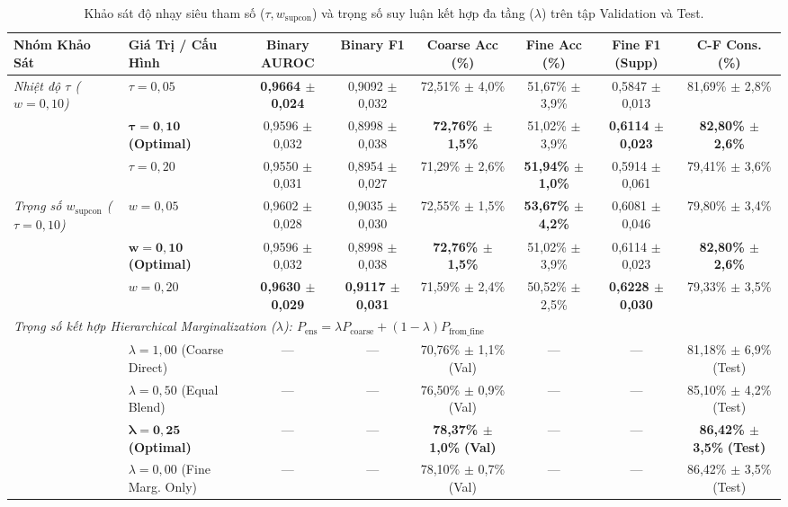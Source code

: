 \begin{table}[t]
\centering
\small
\caption{Khảo sát độ nhạy siêu tham số ($\tau, w_{\text{supcon}}$) và trọng số suy luận kết hợp đa tầng ($\lambda$) trên tập Validation và Test.}
\label{tab:ablation_hyperparameters_blending}
\begin{adjustbox}{width=\textwidth}
\begin{tabular}{llcccccc}
\toprule
\textbf{Nhóm Khảo Sát} & \textbf{Giá Trị / Cấu Hình} & \textbf{Binary AUROC} & \textbf{Binary F1} & \textbf{Coarse Acc (\%)} & \textbf{Fine Acc (\%)} & \textbf{Fine F1 (Supp)} & \textbf{C-F Cons. (\%)} \\
\midrule
\textit{Nhiệt độ $\tau$ ($w=0{,}10$)} & $\tau = 0{,}05$ & \textbf{0,9664 $\pm$ 0,024} & 0,9092 $\pm$ 0,032 & 72,51\% $\pm$ 4,0\% & 51,67\% $\pm$ 3,9\% & 0,5847 $\pm$ 0,013 & 81,69\% $\pm$ 2,8\% \\
& $\mathbf{\tau = 0{,}10}$ \textbf{(Optimal)} & 0,9596 $\pm$ 0,032 & 0,8998 $\pm$ 0,038 & \textbf{72,76\% $\pm$ 1,5\%} & 51,02\% $\pm$ 3,9\% & \textbf{0,6114 $\pm$ 0,023} & \textbf{82,80\% $\pm$ 2,6\%} \\
& $\tau = 0{,}20$ & 0,9550 $\pm$ 0,031 & 0,8954 $\pm$ 0,027 & 71,29\% $\pm$ 2,6\% & \textbf{51,94\% $\pm$ 1,0\%} & 0,5914 $\pm$ 0,061 & 79,41\% $\pm$ 3,6\% \\
\midrule
\textit{Trọng số $w_{\text{supcon}}$ ($\tau=0{,}10$)} & $w = 0{,}05$ & 0,9602 $\pm$ 0,028 & 0,9035 $\pm$ 0,030 & 72,55\% $\pm$ 1,5\% & \textbf{53,67\% $\pm$ 4,2\%} & 0,6081 $\pm$ 0,046 & 79,80\% $\pm$ 3,4\% \\
& $\mathbf{w = 0{,}10}$ \textbf{(Optimal)} & 0,9596 $\pm$ 0,032 & 0,8998 $\pm$ 0,038 & \textbf{72,76\% $\pm$ 1,5\%} & 51,02\% $\pm$ 3,9\% & 0,6114 $\pm$ 0,023 & \textbf{82,80\% $\pm$ 2,6\%} \\
& $w = 0{,}20$ & \textbf{0,9630 $\pm$ 0,029} & \textbf{0,9117 $\pm$ 0,031} & 71,59\% $\pm$ 2,4\% & 50,52\% $\pm$ 2,5\% & \textbf{0,6228 $\pm$ 0,030} & 79,33\% $\pm$ 3,5\% \\
\midrule
\multicolumn{8}{l}{\textit{Trọng số kết hợp Hierarchical Marginalization ($\lambda$): $P_{\text{ens}} = \lambda P_{\text{coarse}} + (1-\lambda) P_{\text{from\_fine}}$}} \\
& $\lambda = 1{,}00$ (Coarse Direct) & --- & --- & 70,76\% $\pm$ 1,1\% (Val) & --- & --- & 81,18\% $\pm$ 6,9\% (Test) \\
& $\lambda = 0{,}50$ (Equal Blend) & --- & --- & 76,50\% $\pm$ 0,9\% (Val) & --- & --- & 85,10\% $\pm$ 4,2\% (Test) \\
& $\mathbf{\lambda = 0{,}25}$ \textbf{(Optimal)} & --- & --- & \textbf{78,37\% $\pm$ 1,0\%} \textbf{(Val)} & --- & --- & \textbf{86,42\% $\pm$ 3,5\%} \textbf{(Test)} \\
& $\lambda = 0{,}00$ (Fine Marg. Only) & --- & --- & 78,10\% $\pm$ 0,7\% (Val) & --- & --- & 86,42\% $\pm$ 3,5\% (Test) \\
\bottomrule
\end{tabular}
\end{adjustbox}
\end{table}
